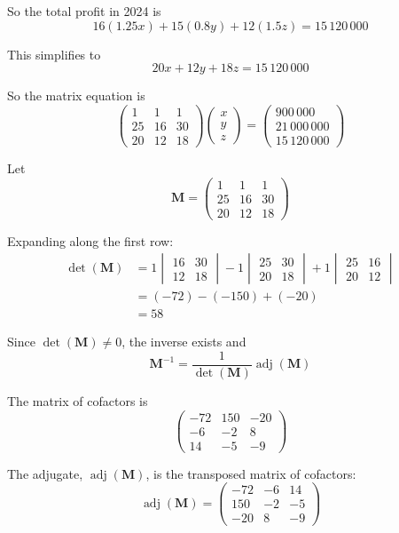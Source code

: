 \documentclass[leqno]{article}
\begin{document}
\begin{enumerate}[
  label=\textbf{\arabic*.},
  leftmargin=*,
  topsep=0pt,
  partopsep=0pt,
  parsep=0pt
]
\begin{djsSolution}
So the total profit in 2024 is
\[
16(1.25x)+15(0.8y)+12(1.5z)=15\,120\,000
\]

This simplifies to
\[
20x+12y+18z=15\,120\,000
\]

So the matrix equation is
\[
\begin{pmatrix}
1&1&1\\
25&16&30\\
20&12&18
\end{pmatrix}
\begin{pmatrix}
x\\y\\z
\end{pmatrix}
=
\begin{pmatrix}
900\,000\\21\,000\,000\\15\,120\,000
\end{pmatrix}
\]

Let
\[
\mathbf{M}=
\begin{pmatrix}
1&1&1\\
25&16&30\\
20&12&18
\end{pmatrix}
\]

Expanding along the first row:
\begin{align*}
\det(\mathbf{M})
&=1\begin{vmatrix}16&30\\12&18\end{vmatrix}
-1\begin{vmatrix}25&30\\20&18\end{vmatrix}
+1\begin{vmatrix}25&16\\20&12\end{vmatrix}\\
&=(-72)-(-150)+(-20)\\
&=58
\end{align*}

Since \(\det(\mathbf{M})\neq 0\), the inverse exists and
\[
\mathbf{M}^{-1}=\frac{1}{\det(\mathbf{M})}\operatorname{adj}(\mathbf{M})
\]

The matrix of cofactors is
\[
\begin{pmatrix}
-72&150&-20\\
-6&-2&8\\
14&-5&-9
\end{pmatrix}
\]

The adjugate, \(\operatorname{adj}(\mathbf{M})\), is the transposed matrix of cofactors:
\[
\operatorname{adj}(\mathbf{M})=
\begin{pmatrix}
-72&-6&14\\
150&-2&-5\\
-20&8&-9
\end{pmatrix}
\]


\end{djsSolution}
\end{enumerate}
\end{document}
